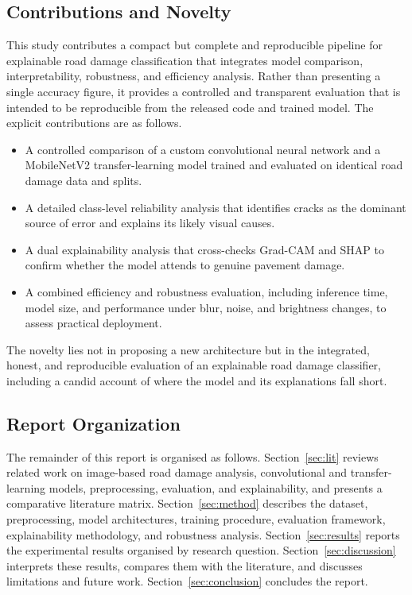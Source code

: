 \documentclass[preprint,12pt]{elsarticle}
\begin{document}
\subsection{Contributions and Novelty}

This study contributes a compact but complete and reproducible pipeline for explainable road damage classification that integrates model comparison, interpretability, robustness, and efficiency analysis.
Rather than presenting a single accuracy figure, it provides a controlled and transparent evaluation that is intended to be reproducible from the released code and trained model.
The explicit contributions are as follows.
\begin{itemize}
    \item A controlled comparison of a custom convolutional neural network and a MobileNetV2 transfer-learning model trained and evaluated on identical road damage data and splits.
    \item A detailed class-level reliability analysis that identifies cracks as the dominant source of error and explains its likely visual causes.
    \item A dual explainability analysis that cross-checks Grad-CAM and SHAP to confirm whether the model attends to genuine pavement damage.
    \item A combined efficiency and robustness evaluation, including inference time, model size, and performance under blur, noise, and brightness changes, to assess practical deployment.
\end{itemize}
The novelty lies not in proposing a new architecture but in the integrated, honest, and reproducible evaluation of an explainable road damage classifier, including a candid account of where the model and its explanations fall short.

\subsection{Report Organization}

The remainder of this report is organised as follows.
Section~\ref{sec:lit} reviews related work on image-based road damage analysis, convolutional and transfer-learning models, preprocessing, evaluation, and explainability, and presents a comparative literature matrix.
Section~\ref{sec:method} describes the dataset, preprocessing, model architectures, training procedure, evaluation framework, explainability methodology, and robustness analysis.
Section~\ref{sec:results} reports the experimental results organised by research question.
Section~\ref{sec:discussion} interprets these results, compares them with the literature, and discusses limitations and future work.
Section~\ref{sec:conclusion} concludes the report.
\end{document}
